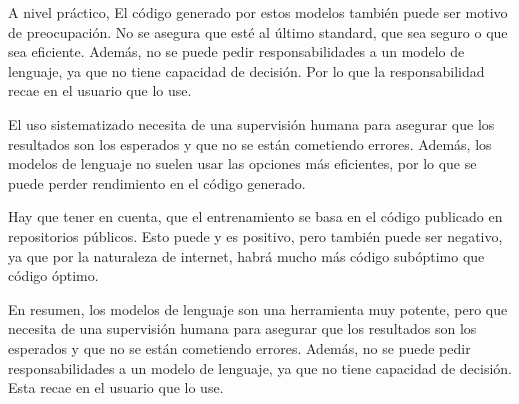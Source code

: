 \documentclass[a4paper,twocolumn]{article}
\begin{document}
    A nivel práctico,
    El código generado por estos modelos también puede ser motivo de preocupación.
    No se asegura que esté al último standard, que sea seguro o que sea eficiente.
    Además, no se puede pedir responsabilidades a un modelo de lenguaje, ya que no tiene capacidad de decisión.
    Por lo que la responsabilidad recae en el usuario que lo use.

    El uso sistematizado necesita de una supervisión humana para asegurar que los resultados son los esperados y que no se están cometiendo errores.
    Además, los modelos de lenguaje no suelen usar las opciones más eficientes, por lo que se puede perder rendimiento en el código generado.

    Hay que tener en cuenta, que el entrenamiento se basa en el código publicado en repositorios públicos.
    Esto puede y es positivo, pero también puede ser negativo, ya que por la naturaleza de internet, habrá mucho más código subóptimo que código óptimo.

    En resumen, los modelos de lenguaje son una herramienta muy potente, pero que necesita de una supervisión humana para asegurar que los resultados son los esperados y que no se están cometiendo errores.
    Además, no se puede pedir responsabilidades a un modelo de lenguaje, ya que no tiene capacidad de decisión.
    Esta recae en el usuario que lo use.

    \newpage






%    
    \printbibliography

    \clearpage


    \makeatletter
    \newcommand\appendix@section[1]{%
        \refstepcounter{section}%
        \orig@section*{Apéndice \@Alph\c@section: #1}%
        \addcontentsline{toc}{section}{Apéndice \@Alph\c@section: #1}%
    }
    \let\orig@section\section
    \g@addto@macro\appendix{\let\section\appendix@section}
    \makeatother
\end{document}
